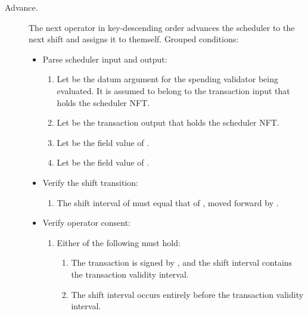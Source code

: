 \documentclass[../midgard.tex]{subfiles}
\begin{document}
\begin{description}
    \item[Advance.] The next operator in key-descending order advances the scheduler to the next shift and assigns it to themself.
      Grouped conditions:
        \begin{itemize}
            \item Parse scheduler input and output:
            \begin{enumerate}
                \item Let  be the datum argument for the spending validator being evaluated.
                  It is assumed to belong to the transaction input that holds the scheduler NFT.
                \item Let  be the transaction output that holds the scheduler NFT.
                \item Let  be the  field value of .
                \item Let  be the  field value of .
            \end{enumerate}
            \item Verify the shift transition:
            \begin{enumerate}[resume]
                \item The shift interval of  must equal that of , moved forward by .
            \end{enumerate}
            
            \item Verify operator consent:
            \begin{enumerate}[resume]
                \item Either of the following must hold:
                \begin{enumerate}
                    \item The transaction is signed by , and the  shift interval contains the transaction validity interval.
                    \item The  shift interval occurs entirely before the transaction validity interval.
                \end{enumerate}
            \end{enumerate}
            

\end{itemize}
\end{description}
\end{document}
